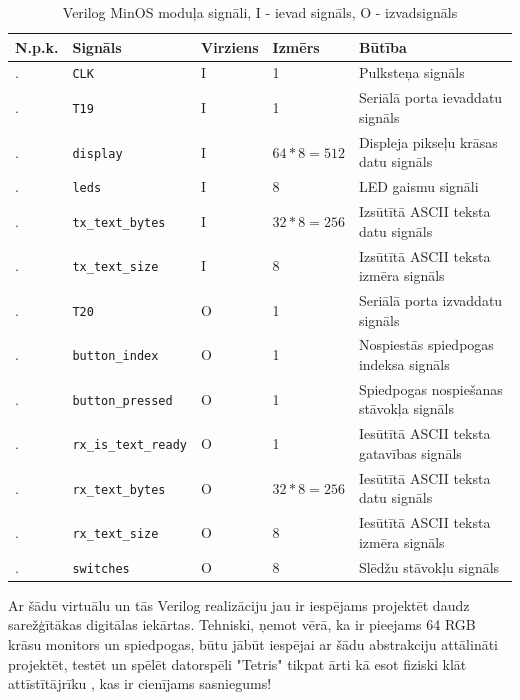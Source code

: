 \begin{table}[H]
    \newcommand\rownumber{\stepcounter{minossignalcounter}\arabic{minossignalcounter}.}
    \begin{tabular}{ |p{1cm}|p{3cm}|p{2cm}|p{3cm}|p{6cm}| }
    \hline
    N.p.k.&Signāls&Virziens&Izmērs&Būtība \\
    \hline
    \rownumber&\lstinline!CLK!&I&1&Pulksteņa signāls \\
    \hline
    \rownumber&\lstinline!T19!&I&1&Seriālā porta ievaddatu signāls \\
    \hline
    \rownumber&\lstinline!display!&I&\(64 * 8 = 512\)&Displeja pikseļu krāsas datu signāls \\
    \hline
    \rownumber&\lstinline!leds!&I&8&LED gaismu signāli \\
    \hline
    \rownumber&\lstinline!tx_text_bytes!&I&\(32 * 8 = 256\)&Izsūtītā ASCII teksta datu signāls \\
    \hline
    \rownumber&\lstinline!tx_text_size!&I&8&Izsūtītā ASCII teksta izmēra signāls \\
    \hline
    \rownumber&\lstinline!T20!&O&1&Seriālā porta izvaddatu signāls \\
    \hline
    \rownumber&\lstinline!button_index!&O&1&Nospiestās spiedpogas indeksa signāls \\
    \hline
    \rownumber&\lstinline!button_pressed!&O&1&Spiedpogas nospiešanas stāvokļa signāls \\
    \hline
    \rownumber&\lstinline!rx_is_text_ready!&O&1&Iesūtītā ASCII teksta gatavības signāls \\
    \hline
    \rownumber&\lstinline!rx_text_bytes!&O&\(32 * 8 = 256\)&Iesūtītā ASCII teksta datu signāls \\
    \hline
    \rownumber&\lstinline!rx_text_size!&O&8&Iesūtītā ASCII teksta izmēra signāls \\
    \hline
    \rownumber&\lstinline!switches!&O&8&Slēdžu stāvokļu signāls \\
    \hline
    \end{tabular}
    \centering
    \captionsetup{justification=centering}
    \caption{Verilog MinOS moduļa signāli, I - ievad signāls, O - izvadsignāls}
    \label{table:minossignals}
\end{table}

Ar šādu virtuālu  un tās Verilog realizāciju jau ir iespējams projektēt
daudz sarežģītākas digitālas iekārtas. Tehniski, ņemot vērā, ka ir pieejams 64
RGB krāsu monitors un spiedpogas, būtu jābūt iespējai ar šādu abstrakciju
attālināti projektēt, testēt un spēlēt datorspēli "Tetris" tikpat ārti kā esot
fiziski klāt attīstītājrīku , kas ir cienījams
sasniegums!

